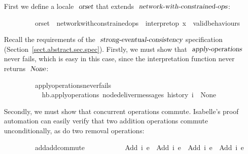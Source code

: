 First we define a locale $\isa{orset}$ that extends $\isa{network-with-constrained-ops}$:
\vspace{0.25em}
\begin{isabellebody}
\ \ \ \ \ \ \ \ \ orset\ {\isacharequal}\ network{\isacharunderscore}with{\isacharunderscore}constrained{\isacharunderscore}ops\ {\isacharunderscore}\ interpret{\isacharunderscore}op\ {\isachardoublequoteopen}{\isacharparenleft}{\isasymlambda}x{\isachardot}\ {\isacharbraceleft}{\isacharbraceright}{\isacharparenright}{\isachardoublequoteclose}\ valid{\isacharunderscore}behaviours
\end{isabellebody}
\vspace{0.25em}

\noindent 
Recall the requirements of the $\isa{strong-eventual-consistency}$ specification (Section~\ref{sect.abstract.sec.spec}).
Firstly, we must show that $\isa{apply-operations}$ never fails, which is easy in this case, since the interpretation function never returns $\isa{None}$:
\vspace{0.25em}
\begin{isabellebody}
\ \ \ \ \ \ \ \ \ apply{\isacharunderscore}operations{\isacharunderscore}never{\isacharunderscore}fails{\isacharcolon}\isanewline
\ \ \ \ \ \ \ \ \ \ \ {\isachardoublequoteopen}hb.apply{\isacharunderscore}operations\ {\isacharparenleft}node{\isacharunderscore}deliver{\isacharunderscore}messages\ {\isacharparenleft}history\ i{\isacharparenright}{\isacharparenright}\ {\isasymnoteq}\ None{\isachardoublequoteclose}
\end{isabellebody}
\vspace{0.25em}
\noindent Secondly, we must show that concurrent operations commute.
Isabelle's proof automation can easily verify that two addition operations commute unconditionally, as do two removal operations:
\vspace{0.25em}
\begin{isabellebody}
\ \ \ \ \ \ \ \ \ add{\isacharunderscore}add{\isacharunderscore}commute{\isacharcolon}\isanewline
\ \ \ \ \ \ \ \ \ \ \ {\isachardoublequoteopen}{\isasymlangle}Add\ i{}\ e{}{\isasymrangle}\ {\isasymrhd}\ {\isasymlangle}Add\ i{}\ e{}{\isasymrangle}\ {\isacharequal}\ {\isasymlangle}Add\ i{}\ e{}{\isasymrangle}\ {\isasymrhd}\ {\isasymlangle}Add\ i{}\ e{}{\isasymrangle}{\isachardoublequoteclose}
\end{isabellebody}
